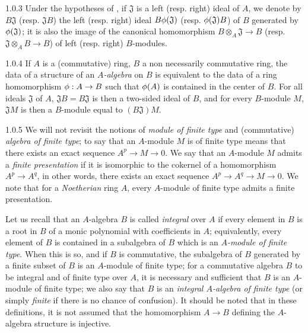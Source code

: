 \begin{env}{1.0.3}
\label{env-0.1.0.3}
Under the hypotheses of , if $\mathfrak{J}$ is a left
(resp. right) ideal of $A$, we denote by $B\mathfrak{J}$ (resp. $\mathfrak{J}B$)
the left (resp. right) ideal $B\phi(\mathfrak{J})$
(resp. $\phi(\mathfrak{J})B$) of $B$ generated by $\phi(\mathfrak{J})$; it is
also the image of the canonical homomorphism $B\otimes_A\mathfrak{J}\to B$
(resp. $\mathfrak{J}\otimes_A B\to B$) of left (resp. right) $B$-modules.
\end{env}

\begin{env}{1.0.4}
\label{env-0.1.0.4}
If $A$ is a (commutative) ring, $B$ a non necessarily commutative ring, the data
of a structure of an \emph{$A$-algebra} on $B$ is equivalent to the data of a
ring homomorphism $\phi:A\to B$ such that $\phi(A)$ is contained in the center
of $B$. For all ideals $\mathfrak{J}$ of $A$, $\mathfrak{J}B=B\mathfrak{J}$ is
then a two-sided ideal of $B$, and for every $B$-module $M$, $\mathfrak{J}M$ is
then a $B$-module equal to $(B\mathfrak{J})M$.
\end{env}

\begin{env}{1.0.5}
\label{env-0.1.0.5}
We will not revisit the notions of \emph{module of finite type} and
(commutative) \emph{algebra of finite type}; to say that an $A$-module $M$ is of
finite type means that there exists
an exact sequence $A^p\to M\to 0$. We say that an $A$-module $M$ admits a
\emph{finite presentation} if it is isomorphic to the cokernel of a homomorphism
$A^p\to A^q$, in other words, there exists an exact sequence
$A^p\to A^q\to M\to 0$. We note that for a \emph{Noetherian} ring $A$, every
$A$-module of finite type admits a finite presentation.

Let us recall that an $A$-algebra $B$ is called \emph{integral} over $A$ if
every element in $B$ is a root in $B$ of a monic polynomial with coefficients in
$A$; equivalently, every element of $B$ is contained in a subalgebra of $B$
which is an \emph{$A$-module of finite type}. When this is so, and if $B$ is
commutative, the subalgebra of $B$ generated by a finite subset of $B$ is an
$A$-module of finite type; for a commutative algebra $B$ to be integral and of
finite type over $A$, it is necessary and sufficient that $B$ is an $A$-module
of finite type; we also say that $B$ is an \emph{integral $A$-algebra of finite
type} (or simply \emph{finite} if there is no chance of confusion). It should be
noted that in these definitions, it is not assumed that the homomorphism
$A\to B$ defining the $A$-algebra structure is injective.
\end{env}


